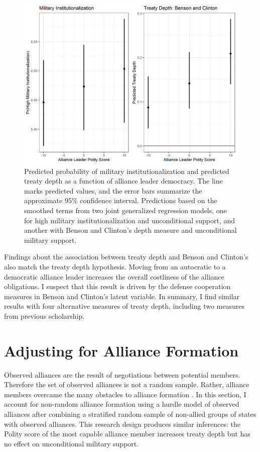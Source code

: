 \documentclass[12pt]{article}
\begin{document}
\begin{figure}
\includegraphics[width=.95\textwidth]{results-alt-measures.png}  
\caption{Predicted probability of military institutionalization and predicted treaty depth as a function of alliance leader democracy. The line marks predicted values, and the error bars summarize the approximate 95\% confidence interval. Predictions based on the smoothed terms from two joint generalized regression models, one for high military institutionalization and unconditional support, and another with Benson and Clinton's depth measure and unconditional military support. }
\label{fig:results-alt-measures}
\end{figure}


Findings about the association between treaty depth and Benson and Clinton's also match the treaty depth hypothesis. 
Moving from an autocratic to a democratic alliance leader increases the overall costliness of the alliance obligations. 
I suspect that this result is driven by the defense cooperation measures in Benson and Clinton's latent variable. 
In summary, I find similar results with four alternative measures of treaty depth, including two measures from previous scholarship. 


\section{Adjusting for Alliance Formation}


Observed alliances are the result of negotiations between potential members. 
Therefore the set of observed alliances is not a random sample.
Rather, alliance members overcame the many obstacles to alliance formation \citep{Poast2019a}.  
In this section, I account for non-random alliance formation using a hurdle model of observed alliances after combining a stratified random sample of non-allied groups of states with observed alliances. 
This research design produces similar inferences: the Polity score of the most capable alliance member increases treaty depth but has no effect on unconditional military support. 
\end{document}
